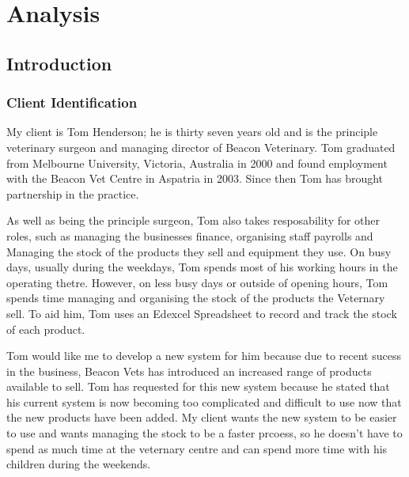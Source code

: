 \chapter{Analysis}

\section{Introduction}

\subsection{Client Identification}

\begin{flushleft}

My client is Tom Henderson; he is thirty seven years old and is the principle veterinary surgeon and managing director of Beacon Veterinary. Tom graduated from Melbourne University, Victoria, Australia in 2000 and found employment with the Beacon Vet Centre in Aspatria in 2003. Since then Tom has brought partnership in the practice. \par 

As well as being the  principle surgeon, Tom also takes resposability for other roles, such as managing the businesses finance, organising staff payrolls and Managing the stock of the products they sell and equipment they use. On busy days, usually during the weekdays, Tom spends most of his working hours in the operating thetre. However, on less busy days or outside of opening hours, Tom spends time managing and organising the stock of the products the Veternary sell. To aid him, Tom uses an Edexcel Spreadsheet to record and track the stock of each product. \par 

Tom would like me to develop a new system for him because due to recent sucess in the business, Beacon Vets has introduced an increased range of  products available to sell. Tom has requested for this new system because he stated that his current system is now becoming too complicated and difficult to use now that the new products have been added. My client wants the new system to be easier to use and wants managing the stock to be a faster prcoess, so he doesn't have to spend as much time at the veternary centre and can spend more time with his children during the weekends.\par


\end{flushleft}

